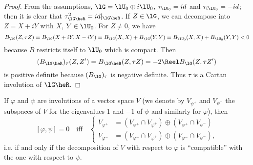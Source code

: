 \begin{proof}
From the assumptions, $\lG=\lU_0\oplus i\lU_0$, $\tau_{\lU_0}=id$ and $\tau_{i\lU_0}=-id$; then it is clear that $\tau_{\lG\heR}^2=id|_{\lG\heR}$. If $Z\in\lG$, we can decompose into $Z=X+iY$ with $X$, $Y\in\lU_0$. For $Z\neq 0$, we have
\begin{equation}
    B_{\lG}(Z,\tau Z)=B_{\lG}(X+iY,X-iY)
                     =B_{\lG}(X,X)+B_{\lG}(Y,Y)
             =B_{\lU_0}(X,X)+B_{\lU_0}(Y,Y)<0
\end{equation}
because $B$ restricts itself to $\lU_0$ which is compact. Then
\begin{equation}
  (B_{\lG\heR})_{\tau}(Z,Z')=B_{\lG\heR}(Z,\tau Z)
                            =-2\Reel B_{\lG}(Z,\tau Z')
\end{equation}
is positive definite because $(B_{\lG})_{\tau}$ is negative definite. Thus $\tau$ is a Cartan involution of $\lG\heR$.
\end{proof}

\begin{lemma}
If $\varphi$ and $\psi$ are involutions of a vector space $V$ (we denote by $V_{\psi^+}$ and $V_{\psi^-}$ the subspaces of $V$ for the eigenvalues $1$ and $-1$ of $\psi$ and similarly for $\varphi$), then
\[
[\varphi,\psi]=0\quad\text{iff}\quad \left\{   \begin{aligned}
                                                   V_{\varphi^+}&=(V_{\varphi^+}\cap V_{\psi^+})\oplus(V_{\varphi^+}\cap V_{\psi^-})\\
                           V_{\varphi^-}&=(V_{\varphi^-}\cap V_{\psi^+})\oplus(V_{\varphi^-}\cap V_{\psi^-}),
                                           \end{aligned}
                      \right.
\]
i.e. if and only if the decomposition of $V$ with respect to $\varphi$ is ``compatible''{} with the one with respect to $\psi$.
\label{lem:invol_compat}
\end{lemma}

